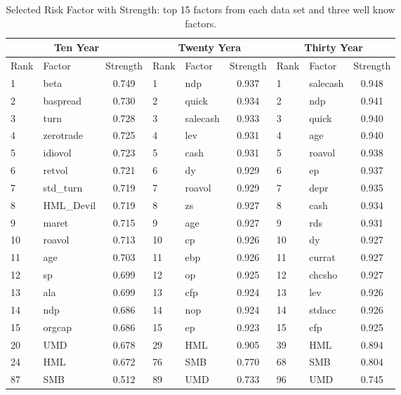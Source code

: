 \begin{table}[]
	\centering
	\caption{Selected Risk Factor with Strength: top 15 factors from each data set and three well know factors.}
	\begin{tabular}{llc|llc|llc}
		\hline
		\multicolumn{3}{c|}{Ten Year} & \multicolumn{3}{c|}{Twenty Yera} & \multicolumn{3}{c}{Thirty Year} \\ \hline
		Rank & Factor     & Strength & Rank   & Factor     & Strength   & Rank   & Factor     & Strength   \\ \hline
		1   & beta               & 0.749    & 1      & ndp           & 0.937      & 1      & salecash  & 0.948\\
		2   & baspread       & 0.730    & 2      & quick        & 0.934      & 2      & ndp          & 0.941\\
		3   & turn               & 0.728    & 3      & salecash   & 0.933      & 3      & quick      & 0.940\\
		4   & zerotrade      & 0.725    & 4      & lev            & 0.931      & 4      & age         & 0.940\\
		5   & idiovol           & 0.723    & 5      & cash         & 0.931      & 5      & roavol    & 0.938\\
		6   & retvol            & 0.721    & 6      & dy             & 0.929      & 6      & ep           & 0.937\\
		7   & std\_turn      & 0.719    & 7      & roavol      & 0.929      & 7      & depr       & 0.935\\
		8   & HML\_Devil & 0.719    & 8      & zs              & 0.927      & 8      & cash       & 0.934\\
		9   & maret           & 0.715    & 9        & age          & 0.927      & 9      & rds         & 0.931\\
		10 & roavol          & 0.713    & 10     & cp             & 0.926      & 10    & dy          & 0.927 \\
		11 & age               & 0.703    &11      & ebp           & 0.926      & 11     & currat   & 0.927 \\ 
		12 & sp                 & 0.699    &12      & op            & 0.925      &12       & chcsho  & 0.927 \\ 
		13 & ala                & 0.699    &13      & cfp          & 0.924       &13      & lev         & 0.926 \\ 
		14 & ndp              & 0.686    &14      & nop          & 0.924       &14     & stdacc     & 0.926 \\ 
		15 & orgcap         & 0.686    &15      & ep            & 0.923       &15     & cfp          & 0.925 \\ 
		20 & UMD            & 0.678    & 29     & HML        & 0.905      & 39     & HML       & 0.894 \\
		24 & HML            & 0.672    & 76     & SMB        & 0.770      & 68     & SMB        & 0.804 \\
		87 & SMB            & 0.512    & 89     & UMD        & 0.733      & 96     & UMD       & 0.745 \\ 
		\hline
	\end{tabular}
\end{table}
